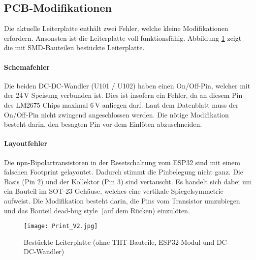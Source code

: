 \subsection{PCB-Modifikationen}
\label{sec:HardwareMod}

Die aktuelle Leiterplatte enthält zwei Fehler, welche kleine Modifikationen erfordern. Ansonsten ist die Leiterplatte voll funktionsfähig. Abbildung \ref{pic:Print} zeigt die mit SMD-Bauteilen bestückte Leiterplatte.

\paragraph{Schemafehler}
Die beiden DC-DC-Wandler (U101 / U102) haben einen On/Off-Pin, welcher mit der 24\,V Speisung verbunden ist. Dies ist insofern ein Fehler, da an diesem Pin des LM2675 Chips maximal 6\,V anliegen darf.
Laut dem Datenblatt muss der On/Off-Pin nicht zwingend angeschlossen werden. Die nötige Modifikation besteht darin, den besagten Pin vor dem Einlöten abzuschneiden.

\paragraph{Layoutfehler} 
Die npn-Bipolartransistoren in der Resetschaltung vom ESP32 sind mit einem falschen Footprint gelayoutet. Dadurch stimmt die Pinbelegung nicht ganz. Die Basis (Pin 2) und der Kollektor (Pin 3) sind vertauscht. Es handelt sich dabei um ein Bauteil im SOT-23 Gehäuse, welches eine vertikale Spiegelsymmetrie aufweist. Die Modifikation besteht darin, die Pins vom Transistor umzubiegen und das Bauteil \flqq dead-bug style\frqq\ (auf dem Rücken) einzulöten.
\vspace{5mm}
\begin{figure}[h]
	\centering
	\texttt{[image: Print\_V2.jpg]}
	\caption{Bestückte Leiterplatte (ohne THT-Bauteile, ESP32-Modul und DC-DC-Wandler)}
	\label{pic:Print}
\end{figure}
